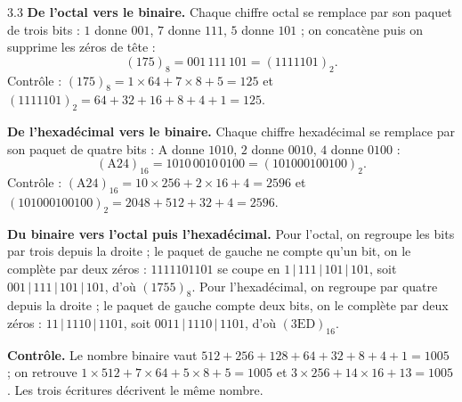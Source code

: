 \begin{corrige}{3.3}
\textbf{De l'octal vers le binaire.} Chaque chiffre octal se remplace par son paquet de trois bits : $1$ donne $001$, $7$ donne $111$, $5$ donne $101$ ; on concatène puis on supprime les zéros de tête :
\[
(175)_8 = 001\,111\,101 = (1111101)_2.
\]
Contrôle : $(175)_8 = 1 \times 64 + 7 \times 8 + 5 = 125$ et $(1111101)_2 = 64 + 32 + 16 + 8 + 4 + 1 = 125$.

\textbf{De l'hexadécimal vers le binaire.} Chaque chiffre hexadécimal se remplace par son paquet de quatre bits : A donne $1010$, $2$ donne $0010$, $4$ donne $0100$ :
\[
(\mathrm{A24})_{16} = 1010\,0010\,0100 = (101000100100)_2.
\]
Contrôle : $(\mathrm{A24})_{16} = 10 \times 256 + 2 \times 16 + 4 = 2596$ et $(101000100100)_2 = 2048 + 512 + 32 + 4 = 2596$.

\textbf{Du binaire vers l'octal puis l'hexadécimal.} Pour l'octal, on regroupe les bits par trois depuis la droite ; le paquet de gauche ne compte qu'un bit, on le complète par deux zéros : $1111101101$ se coupe en $1\,|\,111\,|\,101\,|\,101$, soit $001\,|\,111\,|\,101\,|\,101$, d'où $(1755)_8$. Pour l'hexadécimal, on regroupe par quatre depuis la droite ; le paquet de gauche compte deux bits, on le complète par deux zéros : $11\,|\,1110\,|\,1101$, soit $0011\,|\,1110\,|\,1101$, d'où $(3\mathrm{ED})_{16}$.

\textbf{Contrôle.} Le nombre binaire vaut $512 + 256 + 128 + 64 + 32 + 8 + 4 + 1 = 1005$ ; on retrouve $1 \times 512 + 7 \times 64 + 5 \times 8 + 5 = 1005$ et $3 \times 256 + 14 \times 16 + 13 = 1005$. Les trois écritures décrivent le même nombre.
\end{corrige}

